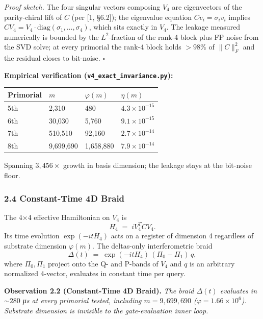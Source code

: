 \documentclass[
]{article}
\newcounter{none} %
\begin{document}
\emph{Proof sketch.} The four singular vectors composing \(V_4\) are
eigenvectors of the parity-chiral lift of \(C\) (per {[}1, §6.2{]}); the
eigenvalue equation \(C v_i = \sigma_i v_i\) implies
\(C V_4 = V_4 \cdot \mathrm{diag}(\sigma_1, \ldots, \sigma_4)\), which
sits exactly in \(V_4\). The leakage measured numerically is bounded by
the \(L^2\)-fraction of the rank-4 block plus FP noise from the SVD
solve; at every primorial the rank-4 block holds \(> 98\%\) of
\(\|C\|_F^2\) and the residual closes to bit-noise. \(\square\)

\textbf{Empirical verification (\texttt{v4\_exact\_invariance.py}):}

{\def\LTcaptype{none} %
\begin{longtable}[]{@{}llll@{}}
\toprule\noalign{}
Primorial & \(m\) & \(\varphi(m)\) & \(\eta(m)\) \\
\midrule\noalign{}
\endhead
\bottomrule\noalign{}
\endlastfoot
5th & 2,310 & 480 & \(4.3 \times 10^{-15}\) \\
6th & 30,030 & 5,760 & \(9.1 \times 10^{-15}\) \\
7th & 510,510 & 92,160 & \(2.7 \times 10^{-14}\) \\
8th & 9,699,690 & 1,658,880 & \(7.9 \times 10^{-14}\) \\
\end{longtable}
}

Spanning \(3{,}456\times\) growth in basis dimension; the leakage stays
at the bit-noise floor.

\subsubsection{2.4 Constant-Time 4D Braid}\label{constant-time-4d-braid}

The 4×4 effective Hamiltonian on \(V_4\) is
\[H_4 \;=\; i V_4^T C V_4. \tag{2.3}\] Its time evolution
\(\exp(-it H_4)\) acts on a register of dimension 4 regardless of
substrate dimension \(\varphi(m)\). The deltas-only interferometric
braid
\[\Delta(t) \;=\; \exp(-it H_4) \, (\Pi_0 - \Pi_1) \, q, \tag{2.4}\]
where \(\Pi_0, \Pi_1\) project onto the Q- and P-bands of \(V_4\) and
\(q\) is an arbitrary normalized 4-vector, evaluates in constant time
per query.

\textbf{Observation 2.2 (Constant-Time 4D Braid).} \emph{The braid
\(\Delta(t)\) evaluates in \(\sim 280\) μs at every primorial tested,
including \(m = 9{,}699{,}690\) (\(\varphi = 1.66 \times 10^6\)).
Substrate dimension is invisible to the gate-evaluation inner loop.}
\end{document}
